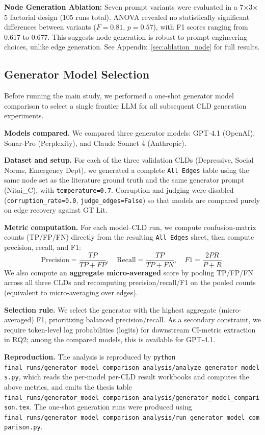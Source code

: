 \textbf{Node Generation Ablation:} Seven prompt variants were evaluated in a 7$\times$3$\times$5 factorial design (105 runs total). ANOVA revealed no statistically significant differences between variants ($F=0.81$, $p=0.57$), with F1 scores ranging from 0.617 to 0.677. This suggests node generation is robust to prompt engineering choices, unlike edge generation. See Appendix~\ref{sec:ablation_node} for full results.

\subsection{Generator Model Selection}

Before running the main study, we performed a one-shot generator model comparison to select a single frontier LLM for all subsequent CLD generation experiments.

\textbf{Models compared.} We compared three generator models: GPT-4.1 (OpenAI), Sonar-Pro (Perplexity), and Claude Sonnet 4 (Anthropic).

\textbf{Dataset and setup.} For each of the three validation CLDs (Depressive, Social Norms, Emergency Dept), we generated a complete \texttt{All Edges} table using the same node set as the literature ground truth and the same generator prompt (Nitai\_C), with \texttt{temperature=0.7}. Corruption and judging were disabled (\texttt{corruption\_rate=0.0}, \texttt{judge\_edges=False}) so that models are compared purely on edge recovery against GT Lit.

\textbf{Metric computation.} For each model--CLD run, we compute confusion-matrix counts (TP/FP/FN) directly from the resulting \texttt{All Edges} sheet, then compute precision, recall, and F1:
\[
\text{Precision}=\frac{TP}{TP+FP},\quad
\text{Recall}=\frac{TP}{TP+FN},\quad
F1=\frac{2PR}{P+R}.
\]
We also compute an \textbf{aggregate micro-averaged} score by pooling TP/FP/FN across all three CLDs and recomputing precision/recall/F1 on the pooled counts (equivalent to micro-averaging over edges).

\textbf{Selection rule.} We select the generator with the highest aggregate (micro-averaged) F1, prioritizing balanced precision/recall. As a secondary constraint, we require token-level log probabilities (logits) for downstream CI-metric extraction in RQ2; among the compared models, this is available for GPT-4.1.

\textbf{Reproduction.} The analysis is reproduced by \texttt{python final\_runs/generator\_model\_comparison\_analysis/analyze\_generator\_models.py}, which reads the per-model per-CLD result workbooks and computes the above metrics, and emits the thesis table \texttt{final\_runs/generator\_model\_comparison\_analysis/generator\_model\_comparison.tex}. The one-shot generation runs were produced using \texttt{final\_runs/generator\_model\_comparison\_analysis/run\_generator\_model\_comparison.py}.


